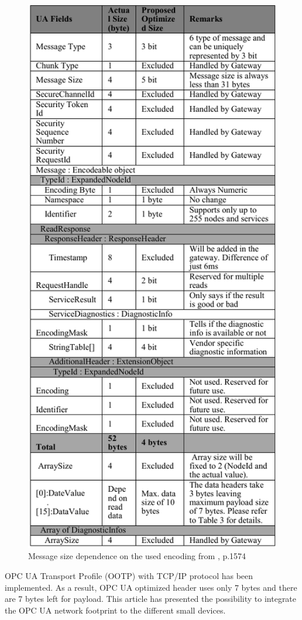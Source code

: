 \documentclass[conference]{IEEEtran}
\begin{document}
\begin{figure}[ht]
\centering
\includegraphics[width=0.78\linewidth]{Figures/optimize}\quad
\caption[Subfigure optimize]{\label{f:optimize}
Message size dependence on the used encoding from \cite{middleware2014optimizing}, p.1574}
\end{figure} 
 OPC UA Transport Profile (OOTP) with TCP/IP protocol has been implemented. As a result, OPC UA optimized header uses only 7 bytes and there are 7 bytes left for payload. This article has presented the possibility to integrate the OPC UA network footprint to the different small devices.
\end{document}
